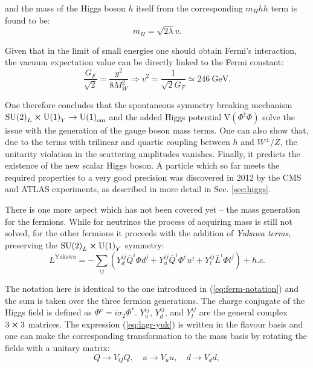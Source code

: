 and the mass of the Higgs boson $h$ itself from the corresponding $m_Hhh$ term is found to be:
\begin{equation}
    m_H = \sqrt{2\lambda}v.
\end{equation}

Given that in the limit of small energies one should obtain Fermi's interaction, the vacuum expectation value can be directly linked to the Fermi constant:
\begin{equation}
    \dfrac{G_F}{\sqrt{2}} = \dfrac{g^2}{8M_W^2} \Rightarrow v^2 = \dfrac{1}{\sqrt{2}G_F} \simeq 246 ~\text{GeV}.
\end{equation}

One therefore concludes that the spontaneous symmetry breaking mechanism $\text{SU(2)}_L \cross \text{U(1)}_Y \to \text{U(1)}_\text{em}$ and the added Higgs potential $\text{V}(\Phi^\dag\Phi)$ solve the issue with the generation of the gauge boson mass terms. One can also show that, due to the terms with trilinear and quartic coupling between $h$ and $W^\pm/Z$, the unitarity violation in the scattering amplitudes vanishes. Finally, it predicts the existence of the new scalar Higgs boson. A particle which so far meets the required properties to a very good precision was discovered in 2012 by the CMS and ATLAS experiments, as described in more detail in Sec. \ref{sec:higgs}.  

There is one more aspect which has not been covered yet -- the mass generation for the fermions. While for neutrinos the process of acquiring mass is still not solved, for the other fermions it proceeds with the addition of \textit{Yukawa terms}, preserving the $\text{SU(2)}_L \cross \text{U(1)}_Y$ symmetry:
\begin{equation}\label{eq:lagr-yuk}
    L^\text{Yukawa} = - \sum_{ij} \left(Y^{ij}_d \bar{Q}^i \Phi d^j + Y^{ij}_u \bar{Q}^i \Phi^c u^j + Y^{ij}_l \bar{L}^i \Phi l^j\right) + h.c.
\end{equation}

The notation here is identical to the one introduced in (\ref{eq:ferm-notation}) and the sum is taken over the three fermion generations. The charge conjugate of the Higgs field is defined as $\Phi^c = i\sigma_2\Phi^*$. $Y^{ij}_u$, $Y^{ij}_d$, and $Y^{ij}_l$ are the general complex $3\cross 3$ matrices. The expression (\ref{eq:lagr-yuk}) is written in the flavour basis and one can make the corresponding transformation to the mass basis by rotating the fields with a unitary matrix:
\begin{equation}
    Q \to V_Q Q, \quad u \to V_u u, \quad d \to V_d d,
\end{equation}

